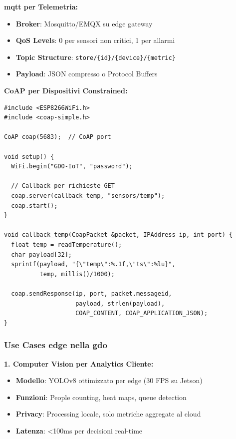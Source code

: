 \textbf{\gls{mqtt} per Telemetria:}
\begin{itemize}
    \item \textbf{Broker}: Mosquitto/EMQX su edge gateway
    \item \textbf{QoS Levels}: 0 per sensori non critici, 1 per allarmi
    \item \textbf{Topic Structure}: \texttt{store/\{id\}/\{device\}/\{metric\}}
    \item \textbf{Payload}: JSON compresso o Protocol Buffers
\end{itemize}

\textbf{CoAP per Dispositivi Constrained:}
\begin{lstlisting}[caption={CoAP Client per Sensore Temperatura},label={lst:coap_sensor}]
#include <ESP8266WiFi.h>
#include <coap-simple.h>

CoAP coap(5683);  // CoAP port

void setup() {
  WiFi.begin("GDO-IoT", "password");
  
  // Callback per richieste GET
  coap.server(callback_temp, "sensors/temp");
  coap.start();
}

void callback_temp(CoapPacket &packet, IPAddress ip, int port) {
  float temp = readTemperature();
  char payload[32];
  sprintf(payload, "{\"temp\":%.1f,\"ts\":%lu}", 
          temp, millis()/1000);
  
  coap.sendResponse(ip, port, packet.messageid, 
                    payload, strlen(payload),
                    COAP_CONTENT, COAP_APPLICATION_JSON);
}
\end{lstlisting}

\subsubsection{\texorpdfstring{\textbf{Use Cases \gls{edge} nella \gls{gdo}}}{3.3.2.4 - Use Cases \gls{edge} nella \gls{gdo}}}

\textbf{1. Computer Vision per Analytics Cliente:}
\begin{itemize}
    \item \textbf{Modello}: YOLOv8 ottimizzato per edge (30 FPS su Jetson)
    \item \textbf{Funzioni}: People counting, heat maps, queue detection
    \item \textbf{Privacy}: Processing locale, solo metriche aggregate al cloud
    \item \textbf{Latenza}: <100ms per decisioni real-time
\end{itemize}

